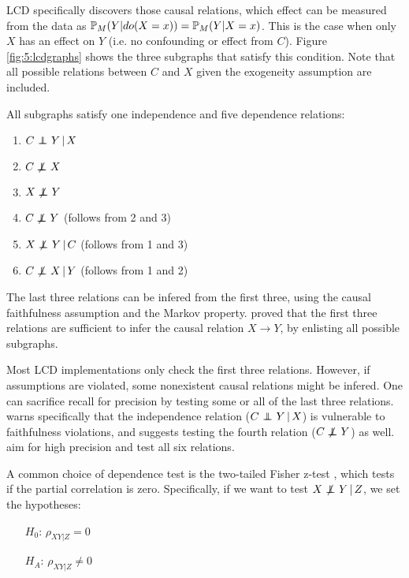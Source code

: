 LCD specifically discovers those causal relations, which effect can be measured from the data as $\mathbb{P} _M(Y|do(X=x)) = \mathbb{P} _M(Y|X=x)$. This is the case when only $X$ has an effect on $Y$ (i.e. no confounding or effect from $C$). Figure \ref{fig:5:lcdgraphs} shows the three subgraphs that satisfy this condition. Note that all possible relations between $C$ and $X$ given the exogeneity assumption are included.

All subgraphs satisfy one independence and five dependence relations:

\begin{enumerate}
    \item $C \operatorname*{{\,\perp\mkern-12mu\perp\,}} Y \,|\, X $
    \item $C \operatorname*{{\,\not\mkern-1mu\perp\mkern-12mu\perp\,}} X$
    \item $X \operatorname*{{\,\not\mkern-1mu\perp\mkern-12mu\perp\,}} Y$
    \item $C \operatorname*{{\,\not\mkern-1mu\perp\mkern-12mu\perp\,}} Y$ (follows from 2 and 3)
    \item $X \operatorname*{{\,\not\mkern-1mu\perp\mkern-12mu\perp\,}} Y \,|\, C$ (follows from 1 and 3)
    \item $C \operatorname*{{\,\not\mkern-1mu\perp\mkern-12mu\perp\,}} X \,|\, Y$ (follows from 1 and 2)
\end{enumerate}

The last three relations can be infered from the first three, using the causal faithfulness assumption and the Markov property. \citet{cooper1997simple} proved that the first three relations are sufficient to infer the causal relation $X\to Y$, by enlisting all possible subgraphs. 

Most LCD implementations only check the first three relations. However, if assumptions are violated, some nonexistent causal relations might be infered. One can sacrifice recall for precision by testing some or all of the last three relations. \citet{cooper1997simple} warns specifically that the independence relation ($C \operatorname*{{\,\perp\mkern-12mu\perp\,}} Y \,|\, X$) is vulnerable to faithfulness violations, and suggests testing the fourth relation ($C \operatorname*{{\,\not\mkern-1mu\perp\mkern-12mu\perp\,}} Y$) as well. \citet{triantafillou2017predicting} aim for high precision and test all six relations.

A common choice of dependence test is the two-tailed Fisher z-test \citep{fisher1924distribution}, which tests if the partial correlation is zero. Specifically, if we want to test $X \operatorname*{{\,\not\mkern-1mu\perp\mkern-12mu\perp\,}} Y \,|\, Z$, we set the hypotheses:

\begin{itemize}
    \item[$H_0$:] $\rho_{XY|Z}=0$
    \item[$H_A$:] $\rho_{XY|Z}\not = 0$
\end{itemize}

